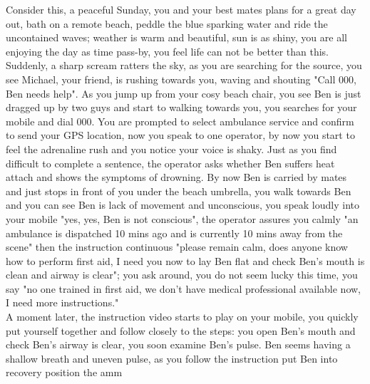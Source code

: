 Consider this, a peaceful Sunday, you and your best mates plans for a great day out, bath on a remote beach, peddle the blue sparking water and ride the uncontained waves; weather is warm and beautiful, sun is as shiny, you are all enjoying the day as time pass-by, you feel life can not be better than this. Suddenly, a sharp scream ratters the sky, as you are searching for the source, you see Michael, your friend, is rushing towards you, waving and shouting "Call 000, Ben needs help". As you jump up from your cosy beach chair, you see Ben is just dragged up by two guys and start to walking towards you, you searches for your mobile and dial 000. You are prompted to select ambulance service and confirm to send your GPS location, now you speak to one operator, by now you start to feel the adrenaline rush and you notice your voice is shaky. Just as you find difficult to complete a sentence, the operator asks whether Ben suffers heat attach and shows the symptoms of drowning. By now Ben is carried by mates and just stops in front of you under the beach umbrella, you walk towards Ben and you can see Ben is lack of movement and unconscious, you speak loudly into your mobile "yes, yes, Ben is not conscious", the operator assures you calmly "an ambulance is dispatched 10 mins ago and is currently 10 mins away from the scene" then the instruction continuous "please remain calm, does anyone know how to perform first aid, I need you now to lay Ben flat and check Ben's mouth is clean and airway is clear"; you ask around, you do not seem lucky this time, you say "no one trained in first aid, we don't have medical professional available now, I need more instructions." \\
A moment later, the instruction video starts to play on your mobile, you quickly put yourself together and follow closely to the steps: you open Ben's mouth and check Ben's airway is clear, you soon examine Ben's pulse. Ben seems having a shallow breath and uneven pulse, as you follow the instruction put Ben into recovery position the amm
